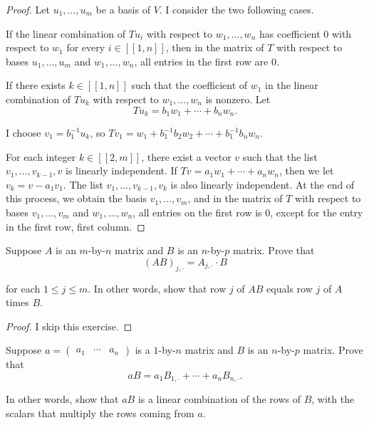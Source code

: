 \begin{proof}
    Let $u_{1}, \ldots, u_{m}$ be a basis of $V$. I consider the two following cases.

    If the linear combination of $Tu_{i}$ with respect to $w_{1}, \ldots, w_{n}$ has coefficient $0$ with respect to $w_{1}$ for every $i\in[\![1,n]\!]$, then in the matrix of $T$ with respect to bases $u_{1}, \ldots, u_{m}$ and $w_{1}, \ldots, w_{n}$, all entries in the first row are $0$.

    If there exists $k\in[\![1,n]\!]$ such that the coefficient of $w_{1}$ in the linear combination of $Tu_{k}$ with respect to $w_{1}, \ldots, w_{n}$ is nonzero. Let
    \[
        Tu_{k} = b_{1}w_{1} + \cdots + b_{n}w_{n}.
    \]

    I choose $v_{1} = {b^{-1}_{1}}u_{k}$, so $Tv_{1} = w_{1} + b^{-1}_{1}b_{2}w_{2} + \cdots + b^{-1}_{1}b_{n}w_{n}$.

    For each integer $k\in[\![2, m]\!]$, there exist a vector $v$ such that the list $v_{1}, \ldots, v_{k-1}, v$ is linearly independent. If $Tv = a_{1}w_{1} + \cdots + a_{n}w_{n}$, then we let $v_{k} = v - a_{1}v_{1}$. The list $v_{1}, \ldots, v_{k-1}, v_{k}$ is also linearly independent. At the end of this process, we obtain the basis $v_{1}, \ldots, v_{m}$, and in the matrix of $T$ with respect to bases $v_{1}, \ldots, v_{m}$ and $w_{1}, \ldots, w_{n}$, all entries on the first row is $0$, except for the entry in the first row, first column.
\end{proof}
\newpage

\begin{exercise}
    Suppose $A$ is an $m$-by-$n$ matrix and $B$ is an $n$-by-$p$ matrix. Prove that
    \[
        {(AB)}_{j,\cdot} = A_{j,\cdot}\cdot B
    \]

    for each $1\leq j\leq m$. In other words, show that row $j$ of $AB$ equals row $j$ of $A$ times $B$.
\end{exercise}

\begin{proof}
    I skip this exercise.
\end{proof}
\newpage

\begin{exercise}
    Suppose $a = \begin{pmatrix}a_{1} & \cdots & a_{n}\end{pmatrix}$ is a $1$-by-$n$ matrix and $B$ is an $n$-by-$p$ matrix. Prove that
    \[
        aB = a_{1}B_{1,\cdot} + \cdots + a_{n}B_{n,\cdot}.
    \]

    In other words, show that $aB$ is a linear combination of the rows of $B$, with the scalars that multiply the rows coming from $a$.
\end{exercise}

